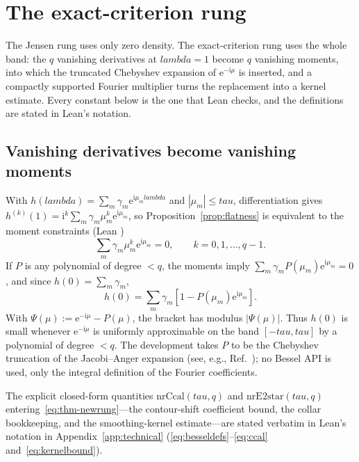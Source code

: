 \documentclass[%
  aps,
  pra,
  preprint,
  superscriptaddress,
  amsmath,amssymb,
  nofootinbib,
  floatfix,
]{revtex4-2}
\def\lambda{lambda}\def\tau{tau}\def\phi{phi}\def\alpha{alpha}%
\theoremstyle{definition}
\theoremstyle{remark}
\newcommand{\tauvar}{\tau}
\DeclareRobustCommand{\lean}[1]{\path{#1}}
\begin{document}
\section{The exact-criterion rung}
\label{sec:newrung}

The Jensen rung uses only zero density. The exact-criterion rung uses the whole band: the
$q$ vanishing derivatives at $\lambda=1$ become $q$ vanishing moments, into which the
truncated Chebyshev expansion of $\mathrm{e}^{-\mathrm{i}\mu}$ is inserted, and a compactly supported
Fourier multiplier turns the replacement into a kernel estimate. Every constant below is the
one that Lean checks, and the definitions are stated in Lean's notation.

\subsection{Vanishing derivatives become vanishing moments}

With $h(\lambda)=\sum_m\gamma_m \mathrm{e}^{\mathrm{i}\mu_m\lambda}$ and $|\mu_m|\le\tauvar$,
differentiation gives $h^{(k)}(1)=\mathrm{i}^k\sum_m\gamma_m\mu_m^k \mathrm{e}^{\mathrm{i}\mu_m}$, so
Proposition~\ref{prop:flatness} is equivalent to the moment constraints (Lean
\lean{h_moments})
\begin{equation}
\displaystyle
\sum_m \gamma_m\mu_m^k \mathrm{e}^{\mathrm{i}\mu_m}=0,
\qquad k=0,1,\ldots,q-1.
\label{eq:moments}
\end{equation}
If $P$ is any polynomial of degree $<q$, the moments imply
$\sum_m\gamma_mP(\mu_m)\mathrm{e}^{\mathrm{i}\mu_m}=0$, and since $h(0)=\sum_m\gamma_m$,
\begin{equation}
\displaystyle
h(0)=\sum_m \gamma_m[1-P(\mu_m)\mathrm{e}^{\mathrm{i}\mu_m}].
\label{eq:replace}
\end{equation}
With $\Psi(\mu):=\mathrm{e}^{-\mathrm{i}\mu}-P(\mu)$, the bracket has modulus $|\Psi(\mu)|$. Thus $h(0)$ is
small whenever $\mathrm{e}^{-\mathrm{i}\mu}$ is uniformly approximable on the band $[-\tauvar,\tauvar]$ by a
polynomial of degree $<q$. The development takes $P$ to be the Chebyshev truncation of
the Jacobi--Anger expansion (see, e.g., Ref.~\cite{MasonHandscomb}); no Bessel API is used,
only the integral definition of the Fourier coefficients.

The explicit closed-form quantities $\mathrm{nrCcal}(\tauvar,q)$ and
$\mathrm{nrE2star}(\tauvar,q)$ entering~\eqref{eq:thm-newrung}---the contour-shift
coefficient bound, the collar bookkeeping, and the smoothing-kernel estimate---are stated
verbatim in Lean's notation in Appendix~\ref{app:technical}
(\eqref{eq:besseldefs}--\eqref{eq:ccal} and~\eqref{eq:kernelbound}).
\end{document}
